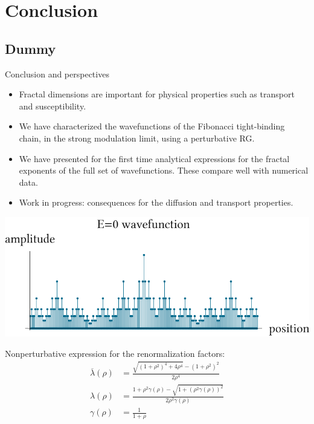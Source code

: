 \documentclass[xcolor=x11names,compress,professionalfonts]{beamer}
\renewcommand{\(}{\begin{columns}}
\renewcommand{\)}{\end{columns}}
\newcommand{\<}[1]{\begin{column}{#1}}
\renewcommand{\>}{\end{column}}
\newcommand{\lb}{\ensuremath{\overline{\lambda}}}
\begin{document}
\section{Conclusion}
\subsection{Dummy}
\begin{frame}{Conclusion and perspectives}
\begin{itemize}
	\item Fractal dimensions are important for physical properties such as transport and susceptibility.
	\item We have characterized the wavefunctions of the Fibonacci tight-binding chain, in the strong modulation limit, using a perturbative RG.
	\item We have presented for the first time analytical expressions for the fractal exponents of the full set of wavefunctions. These compare well with numerical data.
	\item Work in progress: consequences for the diffusion and transport properties.
\end{itemize}
	\centering
	\includegraphics[scale=.55]{E0_wavefunction.pdf}
\end{frame}

\begin{frame}
Nonperturbative expression for the renormalization factors:
\begin{align*}
\label{eq:lb}
	\lb(\rho) &= \frac{\sqrt{(1+\rho^2)^4+4\rho^4}-(1+\rho^2)^2}{2\rho^4}\\
	\lambda(\rho) &= \frac{1+\rho^2 \gamma(\rho) - \sqrt{1+(\rho^2 \gamma(\rho))^2}}{2 \rho^2\gamma(\rho)} \\
	\gamma(\rho) &= \frac{1}{1+\rho}
\end{align*}
\end{frame}
\end{document}
